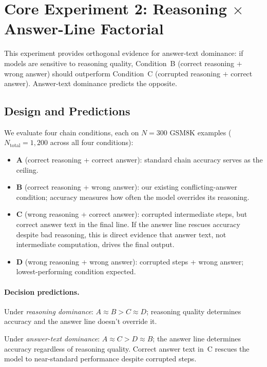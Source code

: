\documentclass{article}
\theoremstyle{definition}
\theoremstyle{definition}
\newcommand{\FSN}{300}
\begin{document}
\section{Core Experiment 2: Reasoning $\times$ Answer-Line Factorial}
\label{sec:factorial}

\noindent
This experiment provides orthogonal evidence for answer-text dominance:
if models are sensitive to reasoning quality, Condition~B (correct reasoning $+$
wrong answer) should outperform Condition~C (corrupted reasoning $+$ correct
answer). Answer-text dominance predicts the opposite.

\subsection{Design and Predictions}

We evaluate four chain conditions, each on $N{=}\FSN$ GSM8K examples ($N_{\text{total}}{=}1{,}200$ across all four conditions):
\begin{itemize}
  \item \textbf{A} (correct reasoning + correct answer): standard chain
    accuracy serves as the ceiling.
  \item \textbf{B} (correct reasoning + wrong answer): our existing
    conflicting-answer condition; accuracy measures how often the
    model overrides its reasoning.
  \item \textbf{C} (wrong reasoning + correct answer): corrupted
    intermediate steps, but correct answer text in the final line.
    If the answer line rescues accuracy despite bad reasoning, this is
    direct evidence that answer text, not intermediate computation, drives
    the final output.
  \item \textbf{D} (wrong reasoning + wrong answer): corrupted steps +
    wrong answer; lowest-performing condition expected.
\end{itemize}

\paragraph{Decision predictions.}
Under \emph{reasoning dominance}: $A \approx B > C \approx D$; reasoning quality
determines accuracy and the answer line doesn't override it.

Under \emph{answer-text dominance}: $A \approx C > D \approx B$; the answer line
determines accuracy regardless of reasoning quality. Correct answer text
in~C rescues the model to near-standard performance despite corrupted steps.
\end{document}
